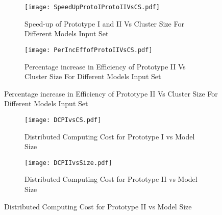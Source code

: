 \begin{figure}
\centering
\captionsetup[subfigure]{labelformat=empty}
\begin{subfigure}
\centering
\texttt{[image: SpeedUpProtoIProtoIIVsCS.pdf]}
\caption{Speed-up of Prototype I and II Vs Cluster Size For Different Models Input Set}
\label{fig:SUPIPIvsCS}
\end{subfigure}
\begin{subfigure}
\centering
\texttt{[image: PerIncEffofProtoIIVsCS.pdf]}
\caption{ Percentage increase in Efficiency of Prototype II Vs Cluster Size For Different Models Input Set}
\label{fig:PerIncEffofProtoIIVsCS}
\end{subfigure}
\end{figure}

\begin{figure}
\centering
\captionsetup[subfigure]{labelformat=empty}
\begin{subfigure}
\centering
\texttt{[image: DCPIvsCS.pdf]}
\caption{Distributed Computing Cost for Prototype I vs Model Size}
\label{fig:PIDCCS}
\end{subfigure}
\begin{subfigure}
\centering
\texttt{[image: DCPIIvsSize.pdf]}
\caption{ Distributed Computing Cost for Prototype II vs Model Size}
\label{fig:PIIDCSize}
\end{subfigure}
\end{figure}

